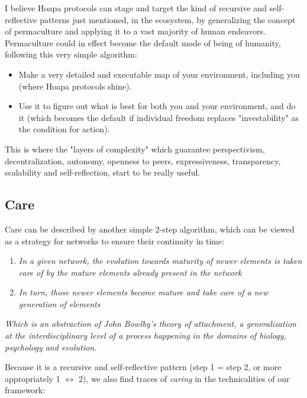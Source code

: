 \documentclass[11pt]{article}
\begin{document}
I believe Hoapa protocols can stage and target the kind of recursive and self-reflective patterns just mentioned, in the ecosystem, by generalizing the concept of permaculture and applying it to a vast majority of human endeavors. Permaculture could in effect become the default mode of being of humanity, following this very simple algorithm:

\begin{itemize}

\item Make a very detailed and executable map of your environment, including you (where Hoapa protocols shine).

\item Use it to figure out what is best for both you and your environment, and do it (which becomes the default if individual freedom replaces "investability" as the condition for action).

\end{itemize}

This is where the "layers of complexity" which guarantee perspectivism, decentralization, autonomy, openness to peers, expressiveness, transparency, scalability and self-reflection, start to be really useful.

\subsection{Care}

Care can be described by another simple 2-step algorithm, which can be viewed as a strategy for networks to ensure their continuity in time:

\begin{enumerate}

\item \emph{In a given network, the evolution towards maturity of newer elements is taken care of by the mature elements already present in the network}

\item \emph{In turn, those newer elements become mature and take care of a new generation of elements}

\end{enumerate}

\emph{Which is an abstraction of John Bowlby's theory of attachment, a generalization at the interdisciplinary level of a process happening in the domains of biology, psychology and evolution.}

Because it is a recursive and self-reflective pattern (step 1 = step 2, or more appropriately 1 \ensuremath{\leftrightarrow} 2), we also find traces of \emph{caring} in the technicalities of our framework:
\end{document}
